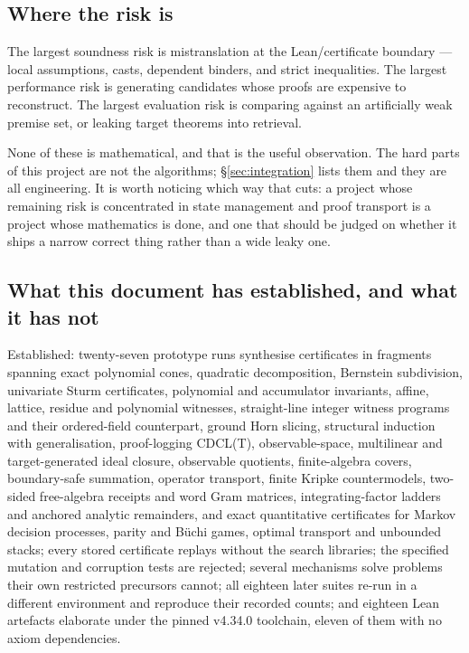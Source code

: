 \subsection{Where the risk is}

The largest soundness risk is mistranslation at the Lean/certificate boundary
--- local assumptions, casts, dependent binders, and strict inequalities. The
largest performance risk is generating candidates whose proofs are expensive to
reconstruct. The largest evaluation risk is comparing against an artificially
weak premise set, or leaking target theorems into retrieval.

None of these is mathematical, and that is the useful observation. The hard
parts of this project are not the algorithms; \S\ref{sec:integration} lists them
and they are all engineering. It is worth noticing which way that cuts: a
project whose remaining risk is concentrated in state management and proof
transport is a project whose mathematics is done, and one that should be judged
on whether it ships a narrow correct thing rather than a wide leaky one.

\subsection{What this document has established, and what it has not}

Established: twenty-seven prototype runs synthesise certificates in fragments
spanning exact polynomial cones, quadratic decomposition, Bernstein subdivision,
univariate Sturm certificates, polynomial and accumulator invariants, affine,
lattice, residue and polynomial witnesses, straight-line integer witness
programs and their ordered-field counterpart, ground Horn slicing, structural
induction with generalisation, proof-logging CDCL(T), observable-space,
multilinear and target-generated ideal closure, observable quotients,
finite-algebra covers, boundary-safe summation, operator transport, finite
Kripke countermodels, two-sided free-algebra receipts and word Gram matrices,
integrating-factor ladders and anchored analytic remainders, and exact
quantitative certificates for Markov decision processes, parity and B\"uchi
games, optimal transport and unbounded stacks; every stored certificate replays
without the search libraries; the specified mutation and corruption tests are
rejected; several mechanisms solve problems their own restricted precursors
cannot; all eighteen later suites re-run in a different environment and
reproduce their recorded counts; and eighteen Lean artefacts elaborate under the
pinned v4.34.0 toolchain, eleven of them with no axiom dependencies.

